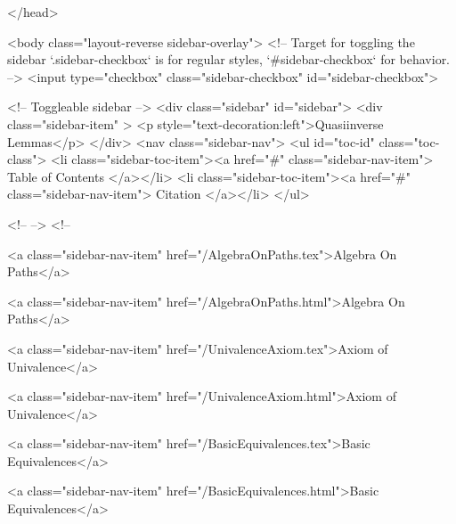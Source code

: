   
</head>




  <body class="layout-reverse sidebar-overlay">
    <!-- Target for toggling the sidebar `.sidebar-checkbox` is for regular
     styles, `#sidebar-checkbox` for behavior. -->
<input type="checkbox" class="sidebar-checkbox" id="sidebar-checkbox">

<!-- Toggleable sidebar -->
<div class="sidebar" id="sidebar">
  <div class="sidebar-item" >
    <p style="text-decoration:left">Quasiinverse Lemmas</p>
  </div>
  <nav class="sidebar-nav">
    <ul id="toc-id" class="toc-class">
  <li class="sidebar-toc-item"><a href="#" class="sidebar-nav-item"> Table of Contents </a></li>
  <li class="sidebar-toc-item"><a href="#" class="sidebar-nav-item"> Citation </a></li>
</ul>


    <!--  -->
    <!-- 
      
    
      
    
      
    
      
    
      
        
      
    
      
        
          <a class="sidebar-nav-item" href="/AlgebraOnPaths.tex">Algebra On Paths</a>
        
      
    
      
        
          <a class="sidebar-nav-item" href="/AlgebraOnPaths.html">Algebra On Paths</a>
        
      
    
      
        
          <a class="sidebar-nav-item" href="/UnivalenceAxiom.tex">Axiom of Univalence</a>
        
      
    
      
        
          <a class="sidebar-nav-item" href="/UnivalenceAxiom.html">Axiom of Univalence</a>
        
      
    
      
        
          <a class="sidebar-nav-item" href="/BasicEquivalences.tex">Basic Equivalences</a>
        
      
    
      
        
          <a class="sidebar-nav-item" href="/BasicEquivalences.html">Basic Equivalences</a>
        
